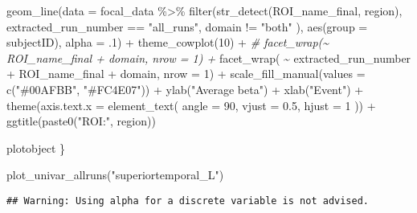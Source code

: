 \documentclass[
]{article}
\newenvironment{Shaded}{\begin{snugshade}}{\end{snugshade}}
\newcommand{\AttributeTok}[1]{\textcolor[rgb]{0.77,0.63,0.00}{#1}}
\newcommand{\CommentTok}[1]{\textcolor[rgb]{0.56,0.35,0.01}{\textit{#1}}}
\newcommand{\DecValTok}[1]{\textcolor[rgb]{0.00,0.00,0.81}{#1}}
\newcommand{\FloatTok}[1]{\textcolor[rgb]{0.00,0.00,0.81}{#1}}
\newcommand{\FunctionTok}[1]{\textcolor[rgb]{0.00,0.00,0.00}{#1}}
\newcommand{\NormalTok}[1]{#1}
\newcommand{\SpecialCharTok}[1]{\textcolor[rgb]{0.00,0.00,0.00}{#1}}
\newcommand{\StringTok}[1]{\textcolor[rgb]{0.31,0.60,0.02}{#1}}
\begin{document}
\begin{Shaded}
\begin{Highlighting}[]
    \FunctionTok{geom\_line}\NormalTok{(}\AttributeTok{data =}\NormalTok{ focal\_data }\SpecialCharTok{\%\textgreater{}\%} \FunctionTok{filter}\NormalTok{(}\FunctionTok{str\_detect}\NormalTok{(ROI\_name\_final, region),                                                extracted\_run\_number }\SpecialCharTok{==} \StringTok{"all\_runs"}\NormalTok{, domain }\SpecialCharTok{!=} \StringTok{"both"}
\NormalTok{),}
              \FunctionTok{aes}\NormalTok{(}\AttributeTok{group =}
\NormalTok{                    subjectID),}
              \AttributeTok{alpha =}\NormalTok{ .}\DecValTok{1}\NormalTok{) }\SpecialCharTok{+}
    \FunctionTok{theme\_cowplot}\NormalTok{(}\DecValTok{10}\NormalTok{) }\SpecialCharTok{+}
    \CommentTok{\# facet\_wrap(\textasciitilde{} ROI\_name\_final + domain, nrow = 1) +}
    \FunctionTok{facet\_wrap}\NormalTok{( }\SpecialCharTok{\textasciitilde{}}\NormalTok{ extracted\_run\_number }\SpecialCharTok{+}\NormalTok{ ROI\_name\_final }\SpecialCharTok{+}\NormalTok{ domain, }\AttributeTok{nrow =} \DecValTok{1}\NormalTok{) }\SpecialCharTok{+}
    \FunctionTok{scale\_fill\_manual}\NormalTok{(}\AttributeTok{values =} \FunctionTok{c}\NormalTok{(}\StringTok{"\#00AFBB"}\NormalTok{, }\StringTok{"\#FC4E07"}\NormalTok{)) }\SpecialCharTok{+}
    \FunctionTok{ylab}\NormalTok{(}\StringTok{"Average beta"}\NormalTok{) }\SpecialCharTok{+}
    \FunctionTok{xlab}\NormalTok{(}\StringTok{"Event"}\NormalTok{) }\SpecialCharTok{+}
    \FunctionTok{theme}\NormalTok{(}\AttributeTok{axis.text.x =} \FunctionTok{element\_text}\NormalTok{(}
      \AttributeTok{angle =} \DecValTok{90}\NormalTok{,}
      \AttributeTok{vjust =} \FloatTok{0.5}\NormalTok{,}
      \AttributeTok{hjust =} \DecValTok{1}
\NormalTok{    )) }\SpecialCharTok{+}
    \FunctionTok{ggtitle}\NormalTok{(}\FunctionTok{paste0}\NormalTok{(}\StringTok{"ROI:"}\NormalTok{, region)) }
  
\NormalTok{  plotobject}
\NormalTok{\}}
\end{Highlighting}
\end{Shaded}

\begin{Shaded}
\begin{Highlighting}[]
\FunctionTok{plot\_univar\_allruns}\NormalTok{(}\StringTok{"superiortemporal\_L"}\NormalTok{)}
\end{Highlighting}
\end{Shaded}

\begin{verbatim}
## Warning: Using alpha for a discrete variable is not advised.
\end{verbatim}
\end{document}
